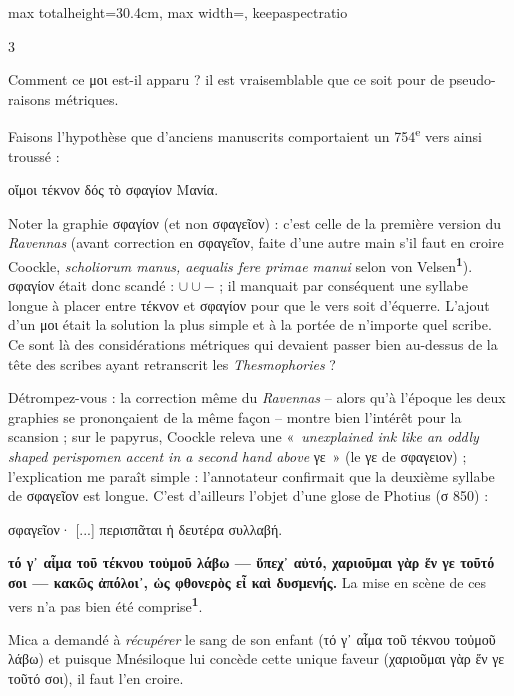 \documentclass[11pt,twoside]{book}
\newcommand{\italique}[1]{\textit{#1}}
\newcommand{\citComm}[1]{\begin{quoting}[vskip=0.4pt,leftmargin=0.7em,rightmargin=0.2em]#1\end{quoting}}
\newcommand{\nieme}[1]{#1\textsuperscript{e}}
\newcommand{\latin}[1]{\textit{#1}}
\newcommand{\anglais}[1]{\textit{#1}}
\newcommand{\marqueur}[1]{\textsuperscript{\color{rubricRed}\textbf{#1}}}
\begin{document}
\begin{adjustbox}{max totalheight=30.4cm, max width=\textwidth, keepaspectratio}
\begin{minipage}{\textwidth}
{\begin{multicols}{3}
\par\vspace{1.5pt}
\noindent Comment ce μοι est-il apparu ? il est vraisemblable que ce soit pour de pseudo-raisons métriques.
\par\vspace{1.5pt}
\noindent Faisons l'hypothèse que d'anciens manuscrits comportaient un \nieme{754} vers ainsi troussé :
\citComm{οἴμοι τέκνον δός τὸ σφαγίον Μανία.}
\par\vspace{1.5pt}
\noindent Noter la graphie σφαγίον (et non σφαγεῖον) : c'est celle de la première version du \italique{Ravennas} (avant correction en σφαγεῖον, faite d'une autre main s'il faut en croire Coockle, \latin{scholiorum manus, aequalis fere primae manui} selon von Velsen\marqueur{1}). σφαγίον était donc scandé : $ \cup \cup - $ ; il manquait par conséquent une syllabe longue à placer entre τέκνον et σφαγίον pour que le vers soit d'équerre. L'ajout d'un μοι était la solution la plus simple et à la portée de n'importe quel scribe.\\ Ce sont là des considérations métriques qui devaient passer bien au-dessus de la tête des scribes ayant retranscrit les \italique{Thesmophories} ?
\par\vspace{1.5pt}
\noindent Détrompez-vous : la correction même du \italique{Ravennas} -- alors qu'à l'époque les deux graphies se prononçaient de la même façon -- montre bien l'intérêt pour la scansion ; sur le papyrus, Coockle releva une «~\anglais{unexplained ink like an oddly shaped perispomen accent in a second hand above} γε~» (le γε de σφαγειον) ; l'explication me paraît simple : l'annotateur confirmait que la deuxième syllabe de σφαγεῖον est longue. C'est d'ailleurs l'objet d'une glose de Photius (σ 850) :
\citComm{σφαγεῖον· [...] περισπᾶται ἡ δευτέρα συλλαβή.}
\par\vspace{1.5pt}
 \textbf{τό γ᾽ αἷμα τοῦ τέκνου τοὐμοῦ λάβω --- ὕπεχ᾽ αὐτό, χαριοῦμαι γὰρ ἕν γε τοῦτό σοι --- κακῶς ἀπόλοι᾽, ὡς φθονερὸς εἶ καὶ δυσμενής.} La mise en scène de ces vers n'a pas bien été comprise\marqueur{1}.
\par\vspace{1.5pt}
\noindent Mica a demandé à \italique{récupérer} le sang de son enfant (τό γ᾽ αἷμα τοῦ τέκνου τοὐμοῦ λάβω) et puisque Mnésiloque lui concède cette unique faveur (χαριοῦμαι γὰρ ἕν γε τοῦτό σοι), il faut l'en croire.
\par\vspace{1.5pt}

\end{multicols}}
\end{minipage}
\end{adjustbox}
\end{document}
